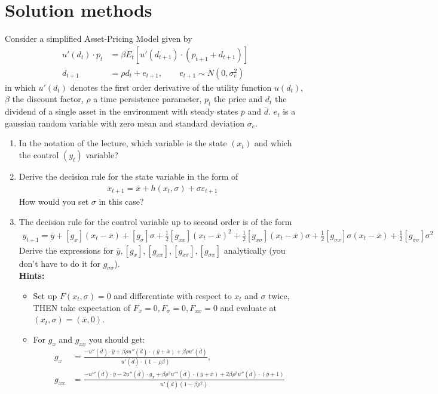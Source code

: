 \documentclass[10pt,a4paper]{article}
\begin{document}
\section{Solution methods}
Consider a simplified Asset-Pricing Model given by
\begin{align*}
u'(d_t) \cdot p_t &= \beta E_t \left[u'(d_{t+1})\cdot(p_{t+1}+d_{t+1})\right]\\
d_{t+1} & = \rho d_t + e_{t+1}, \qquad e_{t+1} \sim N(0,\sigma_e^2)
\end{align*}
in which $u'(d_t)$ denotes the first order derivative of the utility function $u(d_t)$, $\beta$ the discount factor, $\rho$ a time persistence parameter, $p_t$ the price and $d_t$ the dividend of a single asset in the environment with steady states $\overline{p}$ and $\overline{d}$. $e_t$ is a gaussian random variable with zero mean and standard deviation $\sigma_e$. 
\begin{enumerate}
  \item In the notation of the lecture, which variable is the state $(x_t)$ and which the control $(y_t)$ variable?
  \item Derive the decision rule for the state variable in the form of
  \begin{align*}
    x_{t+1} = \overline{x} + h(x_t,\sigma) + \sigma \varepsilon_{t+1}
  \end{align*}
  How would you set $\sigma$ in this case?
  \item The decision rule for the control variable up to second order is of the form
  \begin{align*}
    y_{t+1} = \overline{y} + [g_x](x_t - \overline{x}) + [g_\sigma]\sigma + \frac{1}{2}[g_{xx}](x_t-\overline{x})^2 + \frac{1}{2}[g_{x\sigma}](x_t-\overline{x})\sigma + \frac{1}{2}[g_{\sigma x}] \sigma (x_t-\overline{x}) + \frac{1}{2}[g_{\sigma \sigma}] \sigma^2
  \end{align*}
  Derive the expressions for $\overline{y}, [g_x], [g_{xx}], [g_{x \sigma}], [g_{\sigma x}]$ analytically (you don't have to do it for $g_{\sigma\sigma}$). \\
  \textbf{Hints:}
  \begin{itemize}
    \item Set up $F(x_t,\sigma)=0$ and differentiate with respect to $x_t$ and $\sigma$ twice, THEN take expectation of $F_{x}=0, F_\sigma=0, F_{xx}=0$ and evaluate at $(x_t,\sigma)=(\overline{x},0)$.
    \item For $g_x$ and $g_{xx}$ you should get:
  \begin{align*}
  g_x &= \frac{-u''(\overline{d})\cdot\overline{y} + \beta \rho u''(\overline{d})\cdot(\overline{y}+\overline{x})+\beta\rho u'(\overline{d})}{u'(\overline{d})\cdot(1-\rho \beta)},\\
  g_{xx} &= \frac{-u'''(\overline{d})\cdot \overline{y}-2 u''(\overline{d})\cdot g_x + \beta \rho^2 u'''(\overline{d})\cdot(\overline{y}+\overline{x})+2\beta\rho^2u''(\overline{d})\cdot(\overline{y}+1)}{u'(\overline{d})(1-\beta\rho^2)}
  \end{align*}
  \end{itemize}
\end{enumerate}
\newpage
\end{document}

